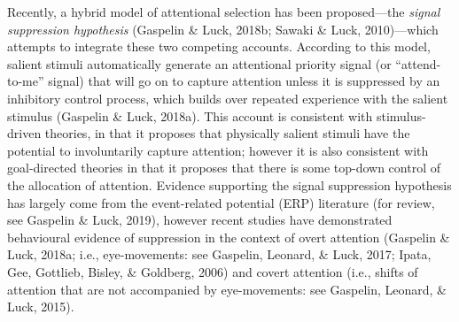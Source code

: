 \documentclass[jou, a4paper, noextraspace,floatsintext]{apa6}
\theoremstyle{definition}
\theoremstyle{definition}
\theoremstyle{definition}
\theoremstyle{remark}
\begin{document}
Recently, a hybrid model of attentional selection has been
proposed---the \emph{signal suppression hypothesis} (Gaspelin \& Luck,
2018b; Sawaki \& Luck, 2010)---which attempts to integrate these two
competing accounts. According to this model, salient stimuli
automatically generate an attentional priority signal (or
\enquote{attend-to-me} signal) that will go on to capture attention
unless it is suppressed by an inhibitory control process, which builds
over repeated experience with the salient stimulus (Gaspelin \& Luck,
2018a). This account is consistent with stimulus-driven theories, in
that it proposes that physically salient stimuli have the potential to
involuntarily capture attention; however it is also consistent with
goal-directed theories in that it proposes that there is some top-down
control of the allocation of attention. Evidence supporting the signal
suppression hypothesis has largely come from the event-related potential
(ERP) literature (for review, see Gaspelin \& Luck, 2019), however
recent studies have demonstrated behavioural evidence of suppression in
the context of overt attention (Gaspelin \& Luck, 2018a; i.e.,
eye-movements: see Gaspelin, Leonard, \& Luck, 2017; Ipata, Gee,
Gottlieb, Bisley, \& Goldberg, 2006) and covert attention (i.e., shifts
of attention that are not accompanied by eye-movements: see Gaspelin,
Leonard, \& Luck, 2015).
\end{document}
